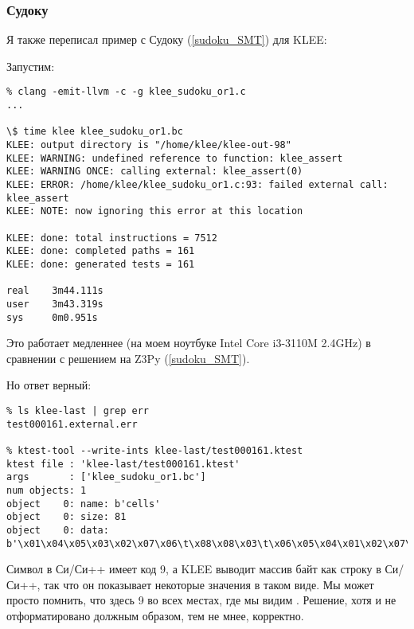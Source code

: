 \subsubsection{Судоку}

Я также переписал пример с Судоку (\ref{sudoku_SMT}) для KLEE:



Запустим:

\begin{lstlisting}
% clang -emit-llvm -c -g klee_sudoku_or1.c
...

\$ time klee klee_sudoku_or1.bc
KLEE: output directory is "/home/klee/klee-out-98"
KLEE: WARNING: undefined reference to function: klee_assert
KLEE: WARNING ONCE: calling external: klee_assert(0)
KLEE: ERROR: /home/klee/klee_sudoku_or1.c:93: failed external call: klee_assert
KLEE: NOTE: now ignoring this error at this location

KLEE: done: total instructions = 7512
KLEE: done: completed paths = 161
KLEE: done: generated tests = 161

real    3m44.111s
user    3m43.319s
sys     0m0.951s
\end{lstlisting}

Это работает медленнее (на моем ноутбуке Intel Core i3-3110M 2.4GHz) в сравнении с решением на Z3Py (\ref{sudoku_SMT}).

Но ответ верный:

\begin{lstlisting}
% ls klee-last | grep err
test000161.external.err

% ktest-tool --write-ints klee-last/test000161.ktest
ktest file : 'klee-last/test000161.ktest'
args       : ['klee_sudoku_or1.bc']
num objects: 1
object    0: name: b'cells'
object    0: size: 81
object    0: data: b'\x01\x04\x05\x03\x02\x07\x06\t\x08\x08\x03\t\x06\x05\x04\x01\x02\x07\x06\x07\x02\t\x01\x08\x05\x04\x03\x04\t\x06\x01\x08\x05\x03\x07\x02\x02\x01\x08\x04\x07\x03\t\x05\x06\x07\x05\x03\x02\t\x06\x04\x08\x01\x03\x06\x07\x05\x04\x02\x08\x01\t\t\x08\x04\x07\x06\x01\x02\x03\x05\x05\x02\x01\x08\x03\t\x07\x06\x04'
\end{lstlisting}

Символ  в Си/Си++ имеет код 9,
а KLEE выводит массив байт как строку в Си/Си++, так что он показывает некоторые значения в таком виде.
Мы может просто помнить, что здесь 9 во всех местах, где мы видим .
Решение, хотя и не отформатировано должным образом, тем не мнее, корректно.

